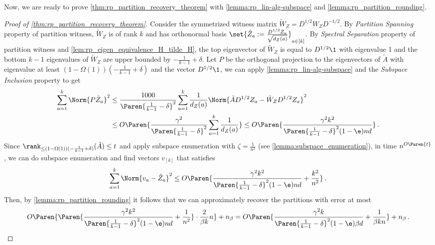 Now, we are ready to prove \cref{thm:rp_partition_recovery_theorem} with \cref{lemma:rp_lin-alg-subspace} and \cref{lemma:rp_partition_rounding}.

\begin{proof}[Proof of \cref{thm:rp_partition_recovery_theorem}]
    Consider the symmetrized witness matrix $\tilde{W}_Z = D^{1/2} W_Z D^{- 1/2}$.
    By \emph{Partition Spanning} property of partition witness, $\tilde{W}_Z$ is of rank $k$ and has orthonormal basis $\set{\tilde{Z}_a:=\frac{D^{1/2} Z_a}{\sqrt{d_Z(a)}}}_{a \in [k]}$.
    By \emph{Spectral Separation} property of partition witness and \cref{lem:rp_eigen_equivalence_H_tilde_H}, the top eigenvector of $\tilde{W}_Z$ is equal to $D^{1/2} \1$ with eigenvalue 1 and the bottom $k-1$ eigenvalues of $\tilde{W}_Z$ are upper bounded by $- \frac{1}{k-1} + \delta$.
    Let $P$ be the orthogonal projection to the eigenvectors of $\tilde{A}$ with eigenvalue at least $(1-\Omega(1))(- \frac{1}{k-1} + \delta)$ and the vector $D^{1/2} \1$, we can apply \cref{lemma:rp_lin-alg-subspace} and the \emph{Subspace Inclusion} property to get
    \begin{align*}
        \sum_{a=1}^k \Norm{P \tilde{Z}_a}^2
        & \leq \frac{1000}{\Paren{\frac{1}{k-1} - \delta}^2} \sum_{a=1}^k \frac{1}{d_Z(a)} \Norm{\tilde{A} D^{1/2} Z_a - \tilde{W}_Z D^{1/2} Z_a}^2 \\
        & \leq O \Paren{\frac{\gamma^2}{\Paren{\frac{1}{k-1} - \delta}^2} \sum_{a=1}^k \frac{1}{d_Z(a)}}
        \leq O \Paren{\frac{\gamma^2 k^2}{\Paren{\frac{1}{k-1} - \delta}^2 (1-\e) nd}} \,.
    \end{align*}
    Since $\rank_{\leq (1-\Omega(1))(- \frac{1}{k-1} + \delta)}(\tilde{A})  \leq t$ and apply subspace enumeration with $\zeta=\frac{1}{n^2}$ (see \cref{lemma:subspace_enumeration}), in time $n^{O\Paren{t}}$, we can do subspace enumeration and find vectors $v_{[k]}$ that satisfies
    \begin{equation*}
        \sum_{a=1}^k \Norm{v_a-\tilde{Z}_a}^2 \leq O \Paren{\frac{\gamma^2 k^2}{\Paren{\frac{1}{k-1} - \delta}^2 (1-\e) nd} + \frac{k^2}{n^2}} \,.
    \end{equation*}
    Then, by \cref{lemma:rp_partition_rounding} it follows that we can approximately recover the partitions with error at most
    \begin{equation*}
        O \Paren{\Paren{\frac{\gamma^2 k^2}{\Paren{\frac{1}{k-1} - \delta}^2 (1-\e) nd} + \frac{1}{n^2}} \cdot \frac{2}{\beta k} n} + n_{\beta}
        = O \Paren{\frac{\gamma^2 k}{\Paren{\frac{1}{k-1} - \delta}^2 (1-\e) \beta d} + \frac{1}{\beta k n}} + n_{\beta} \,.
    \end{equation*}
\end{proof}

